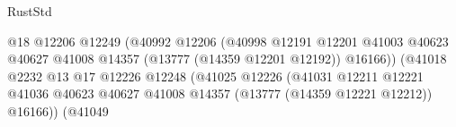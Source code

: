 \begin{lexlean}{RustStd}
\begin{coremodule}
                                                                @18
                                                                @12206
                                                                @12249
                                                                (@40992
                                                                  @12206
                                                                  (@40998
                                                                    @12191
                                                                    @12201
                                                                    @41003
                                                                    @40623
                                                                    @40627
                                                                    @41008
                                                                    @14357
                                                                    (@13777 (@14359 @12201 @12192))
                                                                    @16166))
                                                                (@41018
                                                                  @2232
                                                                  @13
                                                                  @17
                                                                  @12226
                                                                  @12248
                                                                  (@41025
                                                                    @12226
                                                                    (@41031
                                                                      @12211
                                                                      @12221
                                                                      @41036
                                                                      @40623
                                                                      @40627
                                                                      @41008
                                                                      @14357
                                                                      (@13777
                                                                        (@14359 @12221 @12212))
                                                                      @16166))
                                                                  (@41049

\end{coremodule}
\end{lexlean}
